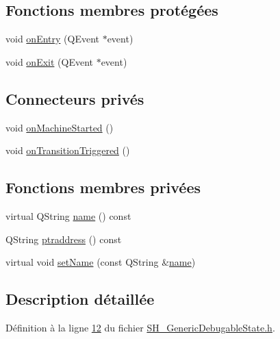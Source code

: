 \subsection*{Fonctions membres protégées}
\begin{DoxyCompactItemize}
\item 
void \hyperlink{classSH__GenericState_a7c30692635023ce7cf65e5ba5bb18a9c}{on\-Entry} (Q\-Event $\ast$event)
\item 
void \hyperlink{classSH__GenericState_accf3326011661417fb0ca0eede3ed9a1}{on\-Exit} (Q\-Event $\ast$event)
\end{DoxyCompactItemize}
\subsection*{Connecteurs privés}
\begin{DoxyCompactItemize}
\item 
void \hyperlink{classSH__GenericState_acb2c9207a5f3c6d32a01b0b7789bb209}{on\-Machine\-Started} ()
\item 
void \hyperlink{classSH__GenericState_addfc0b47a1e83f51b9cd80c86e838be0}{on\-Transition\-Triggered} ()
\end{DoxyCompactItemize}
\subsection*{Fonctions membres privées}
\begin{DoxyCompactItemize}
\item 
virtual Q\-String \hyperlink{classSH__NamedObject_a970f265df31b28b2179bbbceb6170ac2}{name} () const 
\item 
Q\-String \hyperlink{classSH__NamedObject_a98806c492b55a54d01330bbecce5118b}{ptraddress} () const 
\item 
virtual void \hyperlink{classSH__NamedObject_a18e1860b747e029eefa140f8324bb503}{set\-Name} (const Q\-String \&\hyperlink{classSH__NamedObject_a970f265df31b28b2179bbbceb6170ac2}{name})
\end{DoxyCompactItemize}


\subsection{Description détaillée}


Définition à la ligne \hyperlink{SH__GenericDebugableState_8h_source_l00012}{12} du fichier \hyperlink{SH__GenericDebugableState_8h_source}{S\-H\-\_\-\-Generic\-Debugable\-State.\-h}.



